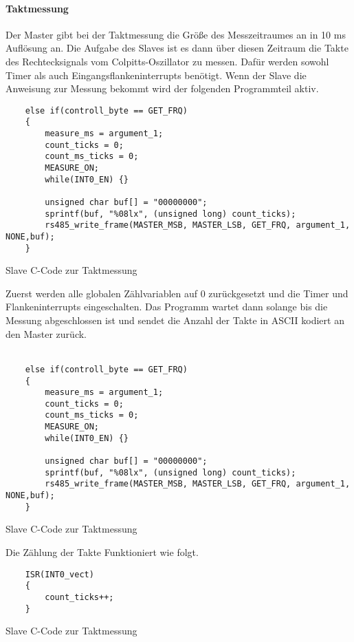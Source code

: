 \paragraph{Taktmessung}\mbox{} 

Der Master gibt bei der Taktmessung die Größe des Messzeitraumes an in 10 ms Auflösung an.
Die Aufgabe des Slaves ist es dann über diesen Zeitraum die Takte des Rechtecksignals vom
Colpitts-Oszillator zu messen. Dafür werden sowohl Timer als auch Eingangsflankeninterrupts
benötigt. Wenn der Slave die Anweisung zur Messung bekommt wird der folgenden Programmteil
aktiv.
\begin{listing}[H]
    \begin{verbatim}
    else if(controll_byte == GET_FRQ)
    {
        measure_ms = argument_1;
        count_ticks = 0;
        count_ms_ticks = 0;
        MEASURE_ON;
        while(INT0_EN) {}
    
        unsigned char buf[] = "00000000";
        sprintf(buf, "%08lx", (unsigned long) count_ticks);
        rs485_write_frame(MASTER_MSB, MASTER_LSB, GET_FRQ, argument_1, NONE,buf);
    } 
    \end{verbatim}
    \caption{ Slave C-Code zur Taktmessung}
\end{listing}


Zuerst werden alle globalen Zählvariablen auf 0 zurückgesetzt und die Timer und Flankeninterrupts
eingeschalten. Das Programm wartet dann solange bis die Messung abgeschlossen ist und sendet
die Anzahl der Takte in ASCII kodiert an den Master zurück. 
\\ \\
\begin{listing}[H]
    \begin{verbatim}
    else if(controll_byte == GET_FRQ)
    {
        measure_ms = argument_1;
        count_ticks = 0;
        count_ms_ticks = 0;
        MEASURE_ON;
        while(INT0_EN) {}
    
        unsigned char buf[] = "00000000";
        sprintf(buf, "%08lx", (unsigned long) count_ticks);
        rs485_write_frame(MASTER_MSB, MASTER_LSB, GET_FRQ, argument_1, NONE,buf);
    } 
    \end{verbatim}
    \caption{ Slave C-Code zur Taktmessung}
\end{listing}
Die Zählung der Takte Funktioniert wie folgt.
\begin{listing}[H]
    \begin{verbatim}
    ISR(INT0_vect)
    {
        count_ticks++;
    }
    \end{verbatim}
    \caption{ Slave C-Code zur Taktmessung}
\end{listing}


